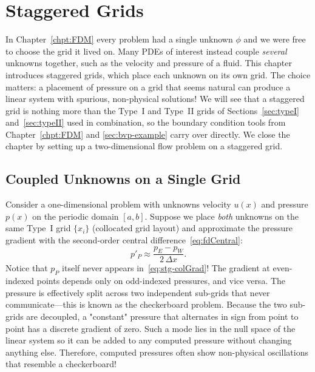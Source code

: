 \chapter{Staggered Grids}
\label{chpt:staggered}

In Chapter~\ref{chpt:FDM} every problem had a single unknown $\phi$ and we were free to choose the grid it lived on. Many PDEs of interest instead couple \emph{several} unknowns together, such as the velocity and pressure of a fluid. This chapter introduces staggered grids, which place each unknown on its own grid. The choice matters: a placement of pressure on a grid that seems natural can produce a linear system with spurious, non-physical solutions! We will see that a staggered grid is nothing more than the Type~I and Type~II grids of Sections~\ref{sec:typeI} and~\ref{sec:typeII} used in combination, so the boundary condition tools from Chapter~\ref{chpt:FDM} and \ref{sec:bvp-example} carry over directly. We close the chapter by setting up a two-dimensional flow problem on a staggered grid.

\section{Coupled Unknowns on a Single Grid}
\label{sec:collocated}

Consider a one-dimensional problem with unknowns velocity $u(x)$ and pressure $p(x)$ on the periodic domain $[a,b]$. Suppose we place \emph{both} unknowns on the same Type~I grid $\{x_i\}$ (collocated grid layout) and approximate the pressure gradient with the second-order central difference~\eqref{eq:fdCentral}:
\begin{equation}
    p'_P \approx \frac{p_E - p_W}{2\,\Delta x}.
    \label{eq:stg-colGrad}
\end{equation}
Notice that $p_P$ itself never appears in~\eqref{eq:stg-colGrad}! The gradient at even-indexed points depends only on odd-indexed pressures, and vice versa. The pressure is effectively split across two independent sub-grids that never communicate---this is known as the checkerboard problem. Because the two sub-grids are decoupled, a "constant" pressure that alternates in sign from point to point has a discrete gradient of zero. Such a mode lies in the null space of the linear system so it can be added to any computed pressure without changing anything else. Therefore, computed pressures often show non-physical oscillations that resemble a checkerboard!

